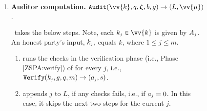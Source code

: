 \begin{figure}[ht]
\begin{center}
{\begin{tcolorbox}[enhanced,width=5.5in, 
    drop fuzzy shadow southwest,
    colframe=black,colback=white]
{{\begin{enumerate}
All parties in $\{A_{\st 1},...,  A_{\st m}\}$ call the same instance of \zspa, which results in  $(k, g, q), ..., (k, g, q)$. 
%

\item\label{ZSPA-A::Auditor-computation}  {\textbf{Auditor computation.} $\mathtt{Audit}( \vv{{k}},  q, \bm\zeta, b, g)\rightarrow (L, \vv{{\mu}})$}. 

\aud\ takes the below steps. Note,  each $k_{\st j}\in \vv{{k}}$ is given by  $  A_{\scriptscriptstyle j}$. An honest party's input, $k_{\scriptscriptstyle j}$,  equals $k$, where $1\leq j \leq m$. 


\begin{enumerate}
%
\item runs the checks in the verification phase (i.e., Phase \ref{ZSPA:verify}) of \zspa for every $j$, i.e., $\mathtt{Verify}(k_{\scriptscriptstyle j}, g, q, m)\rightarrow (a_{\scriptscriptstyle j}, s)$.
\item appends $j$ to $L$, if any checks fails, i.e., if $a_{\scriptscriptstyle j}=0$. In this case, it skips the next two steps for the current $j$. 



%
%
%
%
%


\end{enumerate}
\end{enumerate}}}
\end{tcolorbox}}
\end{center}
\end{figure}

